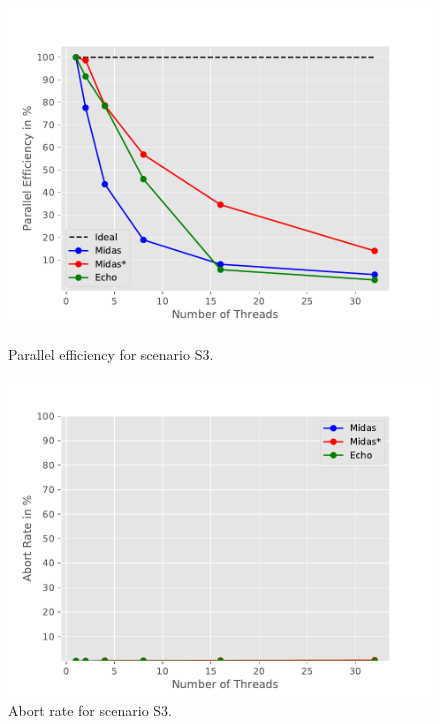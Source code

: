 \begin{figure}[h!]
\begin{minipage}[l]{0.50\textwidth}
    \includegraphics[width=\textwidth]{figures/bench/eff-ls}
    \caption{Parallel efficiency for scenario S3.}
    \label{fig:eff-s3}
\end{minipage}
\begin{minipage}[l]{0.50\textwidth}
    \includegraphics[width=\textwidth]{figures/bench/ar-ls}
    \caption{Abort rate for scenario S3.}
    \label{fig:ar-s3}
\end{minipage}
\end{figure}


